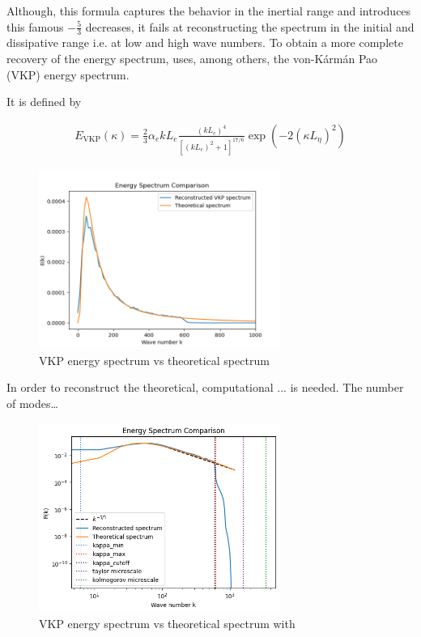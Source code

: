 \documentclass[a4paper,12pt]{article}
\theoremstyle{definition}
\begin{document}
Although, this formula captures the behavior in the inertial range and introduces this famous $-\frac{5}{3}$ decreases, it fails at reconstructing the spectrum in the initial and dissipative range i.e. at low and high wave numbers. To obtain a more complete recovery of the energy spectrum, \cite{Janin2021} uses, among others, the von-Kármán Pao (VKP) energy spectrum.
\bigskip

It is defined by 

\begin{align}
    E_{\text{VKP}}(\kappa)=\frac{2}{3}\alpha_e k L_e \frac{(kL_e)^4}{[(kL_e)^2+1]^{17/6}}\exp(-2(\kappa L_\eta)^2)
\end{align}

\begin{figure}[H]
    \centering
    \includegraphics[width=0.7\textwidth]{illustrations/Energy_Spectrum_VKP.png}
    \caption{VKP energy spectrum vs theoretical spectrum}
    \label{VKPspectrum}
\end{figure}

In order to reconstruct the theoretical, computational ... is needed. The number of modes\dots


\begin{figure}[H]
    \centering
    \includegraphics[width=0.7\textwidth]{illustrations/EnergySpectrumTrained.png}
    \caption{VKP energy spectrum vs theoretical spectrum with}
\end{figure}
\end{document}
